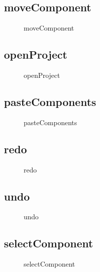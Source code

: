 \documentclass[12pt]{article}
\begin{document}
    \subsection{moveComponent}
    \begin{figure}[H]
        \centering
        
        \caption{moveComponent}
    \end{figure}


    \subsection{openProject}
    \begin{figure}[H]
        \centering
        
        \caption{openProject}
    \end{figure}

    \subsection{pasteComponents}
    \begin{figure}[H]
        \centering
        
        \caption{pasteComponents}
    \end{figure}

    \subsection{redo}
    \begin{figure}[H]
        \centering
        
        \caption{redo}
    \end{figure}

    \subsection{undo}
    \begin{figure}[H]
        \centering
        
        \caption{undo}
    \end{figure}


    \subsection{selectComponent}
    \begin{figure}[H]
        \centering
        
        \caption{selectComponent}
    \end{figure}
\end{document}
